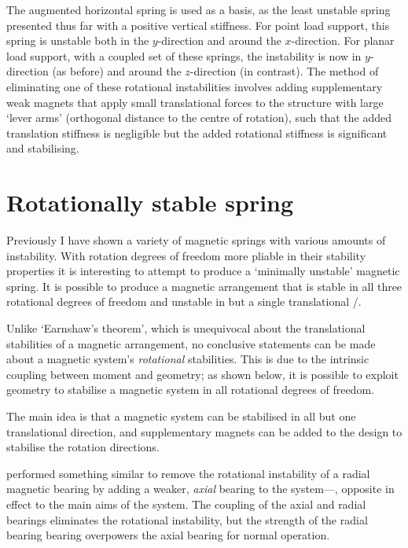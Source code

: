 The augmented horizontal spring is used as a basis, as the least
unstable spring presented thus far with a positive vertical
stiffness. For point load support, this spring is unstable both in the
$y$-direction and around the $x$-direction. For planar load support,
with a coupled set of these springs, the instability is now in $y$-direction
(as before) and around the $z$-direction (in contrast). The
method of eliminating one of these rotational instabilities involves
adding supplementary weak magnets that apply small translational
forces to the structure with large `lever arms' (orthogonal distance
to the centre of rotation), such that the added translation stiffness
is negligible but the added rotational stiffness is significant and
stabilising.


\section{Rotationally stable spring}

Previously I have shown a variety of magnetic springs with various
amounts of instability. With rotation degrees of freedom more pliable
in their stability properties it is interesting to attempt to produce
a `minimally unstable' magnetic spring. It is possible to produce a
magnetic arrangement that is stable in all three rotational degrees of
freedom and unstable in but a single translational \dof/.

Unlike `Earnshaw's theorem', which is unequivocal about the
translational stabilities of a magnetic arrangement, no conclusive
statements can be made about a magnetic system's \emph{rotational}
stabilities. This is due to the intrinsic coupling between moment and
geometry; as shown below, it is possible to exploit geometry to
stabilise a magnetic system in all rotational degrees of freedom.

The main idea is that a magnetic system can be
stabilised in all but one translational direction, and
supplementary magnets can be added to the design to stabilise the
rotation directions.

\textcite{delamare1994} performed something similar to remove the
rotational instability of a radial magnetic bearing by adding a
weaker, \emph{axial} bearing to the system—\ie, opposite in effect
to the main aims of the system. The coupling of the axial and radial
bearings eliminates the rotational instability, but the strength of
the radial bearing bearing overpowers the axial bearing for normal
operation.

